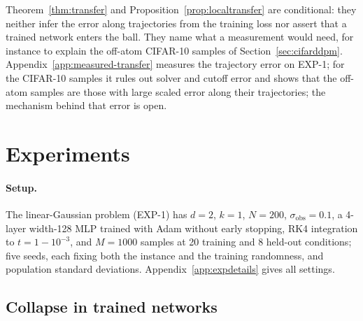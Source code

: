 \documentclass{article} %
\newif\ificlr
\theoremstyle{plain}
\theoremstyle{definition}
\theoremstyle{remark}
\begin{document}
\ificlr Proposition~\ref{prop:regular} in Appendix~\ref{apx:pf-regular} says what a learned field needs to end on an atom at all. A velocity MLP with a smooth embedding of $t\in[0,1]$ has an integrable spatial Lipschitz constant, so its endpoint law has no atom; in $d=1$, a data-predicting one whose bounded prediction is $C^1$ up to $t=1$ ends at the fixed points of that prediction, where every exact mean equals the nearest atom for every label and every $w$. The threshold $w_c$, set at the scale $|x|\sim(1-t)^2$, is then invisible; reproducing it needs a prediction whose spatial derivative is unbounded near the tie, as with the input $\operatorname{asinh}(tx/(1-t)^2)$.
\fi

Theorem~\ref{thm:transfer} and Proposition~\ref{prop:localtransfer} are conditional: they neither infer the error along trajectories from the
training loss nor assert that a trained network enters the ball. \ificlr Appendix~\ref{app:measured-transfer} measures it on EXP-1; on CIFAR-10 the off-atom samples are those with large scaled error.\else They name what a measurement
would need, for instance to explain the off-atom CIFAR-10 samples of Section~\ref{sec:cifarddpm}.
Appendix~\ref{app:measured-transfer} measures the trajectory error on EXP-1; for the CIFAR-10
samples it rules out solver and cutoff error and shows that the off-atom samples are those with
large scaled error along their trajectories; the mechanism behind that error is open.\fi

\section{Experiments}
\label{sec:experiments}

\paragraph{Setup.} The linear-Gaussian problem (EXP-1) has $d{=}2$, $k{=}1$, $N{=}200$,
$\sigma_{\mathrm{obs}}{=}0.1$, a 4-layer width-128 MLP trained with Adam without early stopping,
RK4 integration to $t{=}1{-}10^{-3}$, and $M{=}1000$ samples at 20 training and 8 held-out
conditions; five seeds, each fixing both the instance and the training randomness, and
population standard deviations. Appendix~\ref{app:expdetails} gives all settings.

\subsection{Collapse in trained networks}
\label{sec:exp1}
\end{document}

